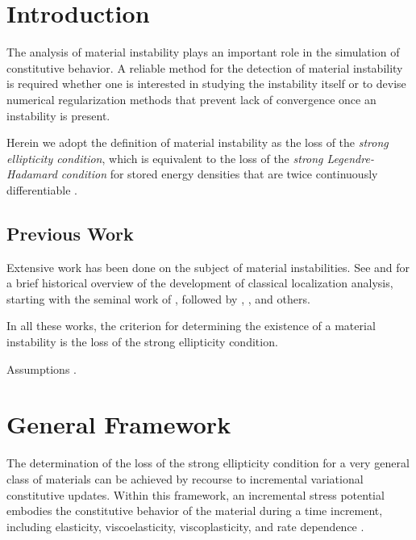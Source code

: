 \documentclass[12pt]{article}
\numberwithin{equation}{section}
\begin{document}
\section{Introduction}
\label{sec:intro}

The analysis of material instability plays an important role in the
simulation of constitutive behavior. A reliable method for the
detection of material instability is required whether one is
interested in studying the instability itself or to devise numerical
regularization methods that prevent lack of convergence once an
instability is present.

Herein we adopt the definition of material instability as the loss of
the \emph{strong ellipticity condition}, which is equivalent to the
loss of the \emph{strong Legendre-Hadamard condition} for stored
energy densities that are twice continuously differentiable
\citep{Antman:2005}.

\subsection{Previous Work}

Extensive work has been done on the subject of material
instabilities. See \citet*{Armero.Garikipati:1996} and
\citet*{Miehe.Lambrecht.Gurses:2004} for a brief historical overview
of the development of classical localization analysis, starting with
the seminal work of \citet{Hadamard:1903}, followed by
\citet{Thomas:1961}, \citet{Hill:1962}, \citet{Rice:1976} and others.

In all these works, the criterion for determining the existence of a
material instability is the loss of the strong ellipticity condition.

Assumptions \citep{Becker:2002}.

\section{General Framework}

The determination of the loss of the strong ellipticity condition for
a very general class of materials can be achieved by recourse to
incremental variational constitutive updates. Within this framework,
an incremental stress potential embodies the constitutive behavior of
the material during a time increment, including elasticity,
viscoelasticity, viscoplasticity, and rate dependence
\citep{Ortiz.Stainier:1999, Lambrecht.Miehe.Dettmar:2003,
  Miehe.Lambrecht.Gurses:2004, Weinberg.etal:2006,
  Fancello.Ponthot.Stainier:2006, Mosler.Bruhns:2010,
  Bleier.Mosler:2012}.
\end{document}
